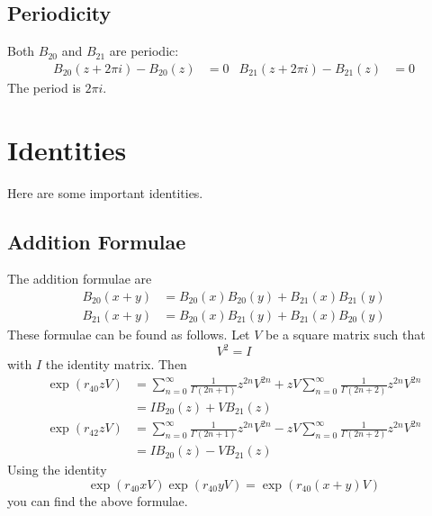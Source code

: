 \subsection{Periodicity}
Both $B_{20}$ and $B_{21}$ are periodic:
\begin{align}
    B_{20}(z + 2\pi i) - B_{20}(z) &= 0 & B_{21}(z + 2\pi i) - B_{21}(z) &= 0
\end{align}
The period is $2\pi i$.
\section{Identities}
Here are some important identities.
\subsection{Addition Formulae}
The addition formulae are
\begin{align}
    B_{20}(x + y) &= B_{20}(x) B_{20}(y) + B_{21}(x) B_{21}(y) \\
    B_{21}(x + y) &= B_{20}(x) B_{21}(y) + B_{21}(x) B_{20}(y)
\end{align}
These formulae can be found as follows. Let $V$ be a square matrix such that
\begin{equation}
    V^{2} = I
\end{equation}
with $I$ the identity matrix. Then
\begin{align}
    \exp\left( r_{40} z V \right) &= \sum_{n = 0}^{\infty} \frac{1}{\Gamma(2n + 1)} z^{2n} V^{2n} + z V \sum_{n = 0}^{\infty} \frac{1}{\Gamma(2n + 2)} z^{2n} V^{2n} \\ &= I B_{20}(z) + V B_{21}(z) \\
    \exp\left( r_{42} z V \right) &= \sum_{n = 0}^{\infty} \frac{1}{\Gamma(2n + 1)} z^{2n} V^{2n} - z V \sum_{n = 0}^{\infty} \frac{1}{\Gamma(2n + 2)} z^{2n} V^{2n} \\ &= I B_{20}(z) - V B_{21}(z)
\end{align}
Using the identity
\begin{equation}
    \exp\left( r_{40} x V \right) \exp\left( r_{40} y V \right) = \exp\left( r_{40} (x + y) V \right)
\end{equation}
you can find the above formulae.

